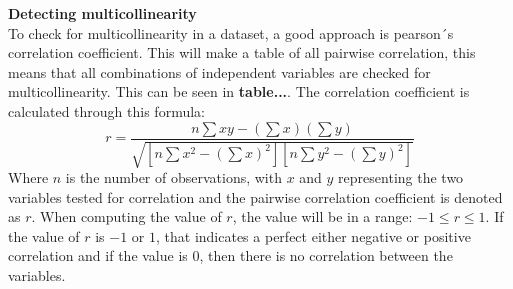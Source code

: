 \textbf{Detecting multicollinearity}\\
To check for multicollinearity in a dataset, a good approach is pearson´s correlation coefficient. This will make a table of all pairwise correlation, this means that all combinations of independent variables are checked for multicollinearity. This can be seen in \textbf{table...}. The correlation coefficient is calculated through this formula:
$$
r = \frac{n \sum xy - (\sum x)(\sum y)}{\sqrt{[n \sum x^2 - (\sum x)^2][n \sum y^2 - (\sum y)^2]}}
$$
Where $n$ is the number of observations, with $x$ and $y$ representing the two variables tested for correlation and the pairwise correlation coefficient is denoted as $r$. When computing the value of $r$, the value will be in a range: $-1\leq r \leq 1$. If the value of $r$ is $-1$ or $1$, that indicates a perfect either negative or positive correlation and if the value is $0$, then there is no correlation between the variables.







